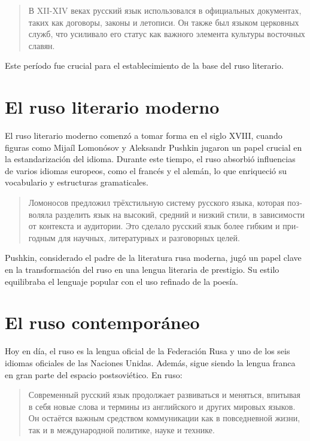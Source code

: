 \begin{quote}
\foreignlanguage{russian}{
В XII-XIV веках русский язык использовался в официальных документах, таких как договоры, законы и летописи. Он также был языком церковных служб, что усиливало его статус как важного элемента культуры восточных славян.}
\end{quote}

Este período fue crucial para el establecimiento de la base del ruso literario.

\section{El ruso literario moderno}

El ruso literario moderno comenzó a tomar forma en el siglo XVIII, cuando figuras como Mijaíl Lomonósov y Aleksandr Pushkin jugaron un papel crucial en la estandarización del idioma. Durante este tiempo, el ruso absorbió influencias de varios idiomas europeos, como el francés y el alemán, lo que enriqueció su vocabulario y estructuras gramaticales.

\begin{quote}
\foreignlanguage{russian}{
Ломоносов предложил трёхстильную систему русского языка, которая позволяла разделить язык на высокий, средний и низкий стили, в зависимости от контекста и аудитории. Это сделало русский язык более гибким и пригодным для научных, литературных и разговорных целей.}
\end{quote}

Pushkin, considerado el padre de la literatura rusa moderna, jugó un papel clave en la transformación del ruso en una lengua literaria de prestigio. Su estilo equilibraba el lenguaje popular con el uso refinado de la poesía.

\section{El ruso contemporáneo}

Hoy en día, el ruso es la lengua oficial de la Federación Rusa y uno de los seis idiomas oficiales de las Naciones Unidas. Además, sigue siendo la lengua franca en gran parte del espacio postsoviético. En ruso:

\begin{quote}
\foreignlanguage{russian}{
Современный русский язык продолжает развиваться и меняться, впитывая в себя новые слова и термины из английского и других мировых языков. Он остаётся важным средством коммуникации как в повседневной жизни, так и в международной политике, науке и технике.}
\end{quote}

